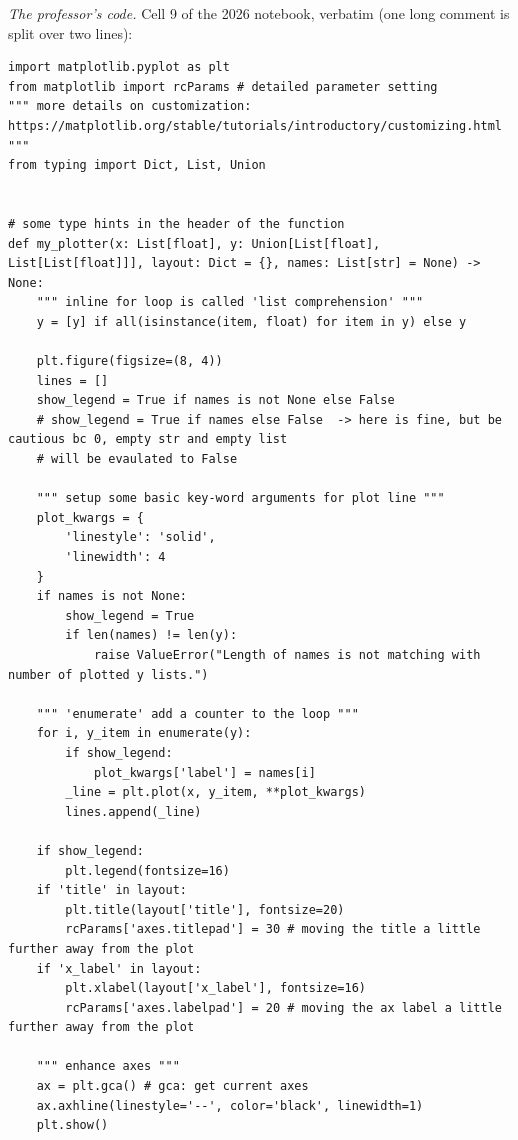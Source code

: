 \documentclass[11pt,a4paper]{article}
\newcommand{\src}[2]{\texttt{#1}, lines #2}
\newcommand{\subhead}[1]{\par\medskip\noindent{\large\bfseries #1}\par\smallskip\noindent\ignorespaces}
\begin{document}
\subhead{What the plotter of cell 9 does.}
\emph{The professor's code.} Cell 9 of the 2026 notebook, verbatim (one long comment is split over two lines):
\par\smallskip\noindent\begin{minipage}{\linewidth}\begin{lstlisting}[style=prof,title={\src{professor\_cell09.py}{4--50}}]
import matplotlib.pyplot as plt
from matplotlib import rcParams # detailed parameter setting
""" more details on customization: https://matplotlib.org/stable/tutorials/introductory/customizing.html """
from typing import Dict, List, Union


# some type hints in the header of the function
def my_plotter(x: List[float], y: Union[List[float], List[List[float]]], layout: Dict = {}, names: List[str] = None) -> None:
    """ inline for loop is called 'list comprehension' """
    y = [y] if all(isinstance(item, float) for item in y) else y
    
    plt.figure(figsize=(8, 4))
    lines = []
    show_legend = True if names is not None else False
    # show_legend = True if names else False  -> here is fine, but be cautious bc 0, empty str and empty list
    # will be evaulated to False

    """ setup some basic key-word arguments for plot line """
    plot_kwargs = {
        'linestyle': 'solid',
        'linewidth': 4
    }
    if names is not None:
        show_legend = True
        if len(names) != len(y):
            raise ValueError("Length of names is not matching with number of plotted y lists.")

    """ 'enumerate' add a counter to the loop """
    for i, y_item in enumerate(y):
        if show_legend:
            plot_kwargs['label'] = names[i]
        _line = plt.plot(x, y_item, **plot_kwargs)
        lines.append(_line)

    if show_legend:
        plt.legend(fontsize=16)
    if 'title' in layout:
        plt.title(layout['title'], fontsize=20)
        rcParams['axes.titlepad'] = 30 # moving the title a little further away from the plot
    if 'x_label' in layout:
        plt.xlabel(layout['x_label'], fontsize=16)
        rcParams['axes.labelpad'] = 20 # moving the ax label a little further away from the plot

    """ enhance axes """
    ax = plt.gca() # gca: get current axes
    ax.axhline(linestyle='--', color='black', linewidth=1)
    plt.show()
\end{lstlisting}\end{minipage}\par\smallskip
\end{document}
